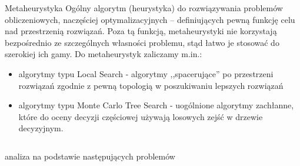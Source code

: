 \documentclass[final,hyperref={pdfpagelabels=false}]{beamer}
\begin{document}
\begin{frame}
\begin{columns}
		\begin{column}{.46\textwidth}
      \begin{block}{Metaheurystyka}
        Ogólny algorytm (heurystyka) do rozwiązywania problemów obliczeniowych, naczęściej optymalizacyjnych -- definiujących pewną funkcję celu nad
        przestrzenią rozwiązań. Poza tą funkcją, metaheurystyki nie korzystają bezpośrednio ze szczególnych własności problemu, stąd łatwo je stosować do
        szerokiej ich gamy. Do metaheurystyk zaliczamy m.in.:
				\begin{itemize}
        \item algorytmy typu Local Search - algorytmy ,,spacerujące'' po przestrzeni rozwiązań zgodnie z pewną topologią w poszukiwaniu lepszych rozwiązań
        \item algorytmy typu Monte Carlo Tree Search - uogólnione algorytmy zachłanne, które do oceny decyzji częściowej używają losowych zejść w drzewie
          decyzyjnym.
				\end{itemize}
			\end{block}
		\end{column}
	\end{columns}
	
  \begin{columns}
    \begin{column}{.96\textwidth}
      \vspace{.5cm}
      \begin{center}
        \veryHuge analiza na podstawie następujących problemów
      \end{center}
      \vspace{.5cm}
    \end{column}
  \end{columns}


\end{frame}
\end{document}
